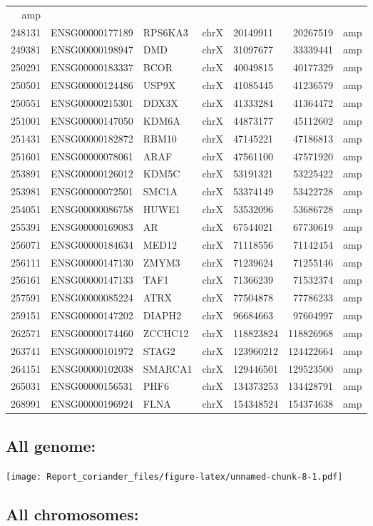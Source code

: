 \documentclass[]{article}
\begin{document}
\begin{longtable}[]{@{}rrlrlrl@{}}
amp\tabularnewline
248131 & ENSG00000177189 & RPS6KA3 & chrX & 20149911 & 20267519 &
amp\tabularnewline
249381 & ENSG00000198947 & DMD & chrX & 31097677 & 33339441 &
amp\tabularnewline
250291 & ENSG00000183337 & BCOR & chrX & 40049815 & 40177329 &
amp\tabularnewline
250501 & ENSG00000124486 & USP9X & chrX & 41085445 & 41236579 &
amp\tabularnewline
250551 & ENSG00000215301 & DDX3X & chrX & 41333284 & 41364472 &
amp\tabularnewline
251001 & ENSG00000147050 & KDM6A & chrX & 44873177 & 45112602 &
amp\tabularnewline
251431 & ENSG00000182872 & RBM10 & chrX & 47145221 & 47186813 &
amp\tabularnewline
251601 & ENSG00000078061 & ARAF & chrX & 47561100 & 47571920 &
amp\tabularnewline
253891 & ENSG00000126012 & KDM5C & chrX & 53191321 & 53225422 &
amp\tabularnewline
253981 & ENSG00000072501 & SMC1A & chrX & 53374149 & 53422728 &
amp\tabularnewline
254051 & ENSG00000086758 & HUWE1 & chrX & 53532096 & 53686728 &
amp\tabularnewline
255391 & ENSG00000169083 & AR & chrX & 67544021 & 67730619 &
amp\tabularnewline
256071 & ENSG00000184634 & MED12 & chrX & 71118556 & 71142454 &
amp\tabularnewline
256111 & ENSG00000147130 & ZMYM3 & chrX & 71239624 & 71255146 &
amp\tabularnewline
256161 & ENSG00000147133 & TAF1 & chrX & 71366239 & 71532374 &
amp\tabularnewline
257591 & ENSG00000085224 & ATRX & chrX & 77504878 & 77786233 &
amp\tabularnewline
259151 & ENSG00000147202 & DIAPH2 & chrX & 96684663 & 97604997 &
amp\tabularnewline
262571 & ENSG00000174460 & ZCCHC12 & chrX & 118823824 & 118826968 &
amp\tabularnewline
263741 & ENSG00000101972 & STAG2 & chrX & 123960212 & 124422664 &
amp\tabularnewline
264151 & ENSG00000102038 & SMARCA1 & chrX & 129446501 & 129523500 &
amp\tabularnewline
265031 & ENSG00000156531 & PHF6 & chrX & 134373253 & 134428791 &
amp\tabularnewline
268991 & ENSG00000196924 & FLNA & chrX & 154348524 & 154374638 &
amp\tabularnewline
\bottomrule
\end{longtable}

\hypertarget{all-genome}{%
\subsection{All genome:}\label{all-genome}}

\texttt{[image: Report\_coriander\_files/figure-latex/unnamed-chunk-8-1.pdf]}

\hypertarget{all-chromosomes}{%
\subsection{All chromosomes:}\label{all-chromosomes}}
\end{document}
